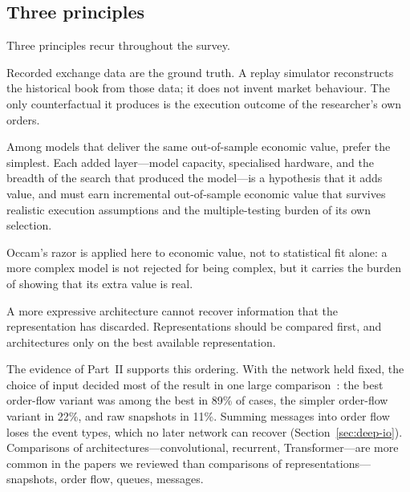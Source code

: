\subsection{Three principles}
\label{sec:principles}

Three principles recur throughout the survey.

\begin{principle}
Recorded exchange data are the ground truth. A replay simulator reconstructs the historical book
from those data; it does not invent market behaviour. The only counterfactual it produces is the
execution outcome of the researcher's own orders.
\end{principle}

\begin{principle}
Among models that deliver the same out-of-sample economic value, prefer the simplest. Each added
layer---model capacity, specialised hardware, and the breadth of the search that produced the
model---is a hypothesis that it adds value, and must earn incremental out-of-sample economic value
that survives realistic execution assumptions and the multiple-testing burden of its own selection.
\end{principle}

\noindent Occam's razor is applied here to economic value, not to statistical fit alone: a more
complex model is not rejected for being complex, but it carries the burden of showing that its
extra value is real.
\begin{principle}
A more expressive architecture cannot recover information that the representation has discarded. Representations
should be compared first, and architectures only on the best available representation.
\end{principle}

\noindent The evidence of Part~II supports this ordering. With the network held fixed, the choice of input decided
most of the result in one large comparison~\citep{lucchese2024}: the best order-flow variant was among the best in 89\% of
cases, the simpler order-flow variant in 22\%, and raw snapshots in 11\%. Summing messages into order flow loses the event types, which no later network can recover
(Section~\ref{sec:deep-io}). Comparisons of architectures---convolutional, recurrent, Transformer---are more common in the papers we reviewed
than comparisons of representations---snapshots, order flow, queues, messages.

